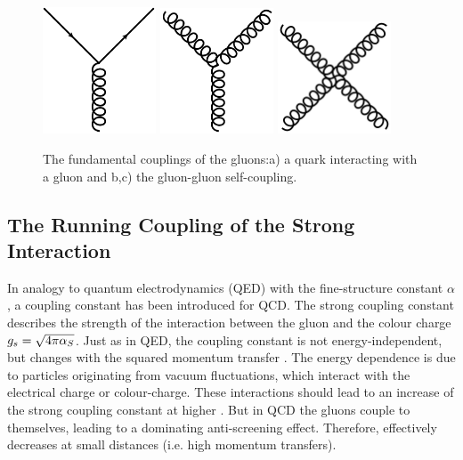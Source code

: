 \begin{figure}[htb]
\centering
\includegraphics[width=0.3\textwidth]{figures/sm_model/fund_2.png}
\includegraphics[width=0.3\textwidth]{figures/sm_model/fund_3.png}
\includegraphics[width=0.3\textwidth]{figures/sm_model/fund_4.png}
\caption[The fundamental couplings of the gluon.]{The fundamental couplings of the gluons:a) a quark interacting with a gluon and b,c) the gluon-gluon self-coupling. }
\label{fig:fundamental:couplings}
\end{figure}


\subsection{The Running Coupling of the Strong Interaction}

In analogy to quantum electrodynamics (QED) with the fine-structure constant $\alpha$, a coupling constant \as has been introduced for QCD. 
The strong coupling constant describes the strength of the interaction between the gluon and the colour charge $g_s = \sqrt{4\pi \alpha_S}$. Just as in QED, the coupling constant is not energy-independent, but changes with the squared momentum transfer \q. The energy dependence is due to particles originating from vacuum fluctuations, which interact with the electrical charge or colour-charge. These interactions should lead to an increase of the strong coupling constant at higher \q. But in QCD the gluons couple to themselves, leading to a dominating anti-screening effect. Therefore, effectively \as decreases at small distances (i.e. high momentum transfers). 

